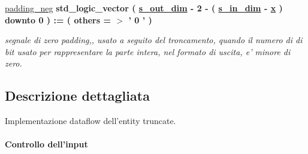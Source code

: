 \begin{DoxyCompactItemize}
\hyperlink{classtruncate_1_1dataflow_a130836df2917c4b75d1fc24500082e76}{padding\+\_\+neg} {\bfseries \textcolor{vhdlchar}{std\+\_\+logic\+\_\+vector}\textcolor{vhdlchar}{ }\textcolor{vhdlchar}{(}\textcolor{vhdlchar}{ }\textcolor{vhdlchar}{ }\textcolor{vhdlchar}{ }\textcolor{vhdlchar}{ }{\bfseries \hyperlink{classtruncate_a8b62f8bfecb0fab845995b8b051101bc}{s\+\_\+out\+\_\+dim}} \textcolor{vhdlchar}{-\/}\textcolor{vhdlchar}{ } \textcolor{vhdldigit}{2} \textcolor{vhdlchar}{-\/}\textcolor{vhdlchar}{ }\textcolor{vhdlchar}{(}\textcolor{vhdlchar}{ }\textcolor{vhdlchar}{ }\textcolor{vhdlchar}{ }\textcolor{vhdlchar}{ }{\bfseries \hyperlink{classtruncate_ad3d18243ad6fe53a2277e2aa9b94ca45}{s\+\_\+in\+\_\+dim}} \textcolor{vhdlchar}{-\/}\textcolor{vhdlchar}{ }\textcolor{vhdlchar}{ }\textcolor{vhdlchar}{ }{\bfseries \hyperlink{classtruncate_1_1dataflow_a63701d8af27da7452a7588efcff357bc}{x}} \textcolor{vhdlchar}{ }\textcolor{vhdlchar}{)}\textcolor{vhdlchar}{ }\textcolor{vhdlchar}{ }\textcolor{vhdlchar}{downto}\textcolor{vhdlchar}{ }\textcolor{vhdlchar}{ } \textcolor{vhdldigit}{0} \textcolor{vhdlchar}{ }\textcolor{vhdlchar}{)}\textcolor{vhdlchar}{ }\textcolor{vhdlchar}{ }\textcolor{vhdlchar}{ }\textcolor{vhdlchar}{\+:}\textcolor{vhdlchar}{=}\textcolor{vhdlchar}{ }\textcolor{vhdlchar}{(}\textcolor{vhdlchar}{ }\textcolor{vhdlchar}{ }\textcolor{vhdlchar}{others}\textcolor{vhdlchar}{ }\textcolor{vhdlchar}{ }\textcolor{vhdlchar}{=}\textcolor{vhdlchar}{ }\textcolor{vhdlchar}{$>$}\textcolor{vhdlchar}{ }\textcolor{vhdlchar}{'}\textcolor{vhdlchar}{ } \textcolor{vhdldigit}{0} \textcolor{vhdlchar}{ }\textcolor{vhdlchar}{'}\textcolor{vhdlchar}{ }\textcolor{vhdlchar}{)}\textcolor{vhdlchar}{ }} 
\begin{DoxyCompactList}\small\item\em segnale di zero padding,, usato a seguito del troncamento, quando il numero di di bit usato per rappresentare la parte intera, nel formato di uscita, e' minore di zero. \end{DoxyCompactList}\end{DoxyCompactItemize}


\subsection{Descrizione dettagliata}
Implementazione dataflow dell'entity truncate. 

\paragraph*{Controllo dell'input}


